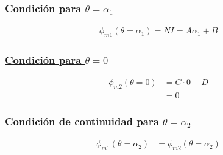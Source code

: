 \documentclass[
  11pt,
  letterpaper,
   addpoints,
   answers
  ]{exam}
\begin{document}
\begin{questions}
\begin{solution}
\begin{enumerate}
            \subsubsection*{\underline{Condición para $\theta =\alpha_{1}$}}
            \begin{align}
                \phi_{m1}(\theta = \alpha_{1}) = NI= A\alpha_{1} + B
            \end{align}
            \subsubsection*{\underline{Condición para $\theta =0$}}
            \begin{align}
                \phi_{m2}(\theta = 0) &=C\cdot 0 + D\\
                                      &= 0
            \end{align}
            \subsubsection*{\underline{Condición de continuidad para $\theta= \alpha_{2}$}}
            \begin{align}
                \phi_{m1}(\theta = \alpha_{2}) &= \phi_{m2}(\theta = \alpha_{2})
            \end{align}
            

\end{enumerate}
\end{solution}
\end{questions}
\end{document}

